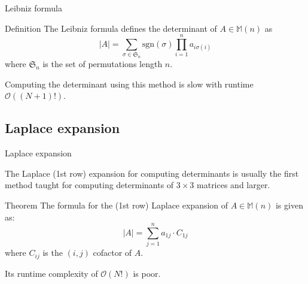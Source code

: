 \documentclass{beamer}
\begin{document}
\begin{frame}{Leibniz formula}

    \begin{block}{Definition}
        The Leibniz formula defines the determinant of $A \in \mathbb{M}(n)$ as
        \[
            |A| = \sum_{\sigma \in \mathfrak{S}_n} \mathrm{sgn}(\sigma)
            \prod_{i=1}^n a_{i \sigma(i)}
        \]
        where $\mathfrak{S}_n$ is the set of permutations length $n$.
    \end{block}

    Computing the determinant using this method is slow with runtime $\mathcal{O}((N+1)!)$.

\end{frame}

\subsection{Laplace expansion}

\begin{frame}{Laplace expansion}

    The Laplace (1st row) expansion for computing determinants is usually the first method taught
    for computing determinants of $3 \times 3$ matrices and larger.

    \begin{block}{Theorem}
        The formula for the (1st row) Laplace expansion of $A \in \mathbb{M}(n)$
        is given as:
        \[
            |A| = \sum_{j=1}^n a_{1j}\cdot C_{1j}
        \]
        where $C_{ij}$ is the $(i, j)$ cofactor of $A$.
    \end{block}

    Its runtime complexity of $\mathcal{O}(N!)$ is poor.

\end{frame}
\end{document}
